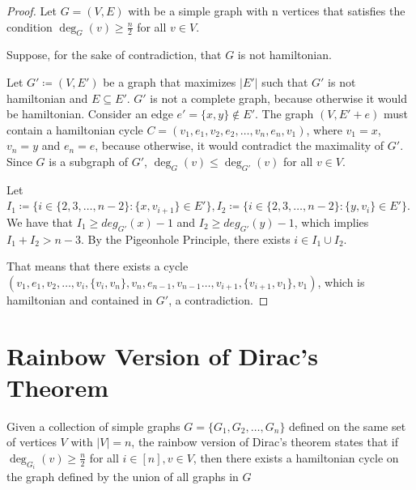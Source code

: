 \begin{proof}
    Let $G = (V, E)$ with be a simple graph with n vertices that satisfies the condition $\deg_G(v) \geq \frac{n}{2}$ for all $v \in V$.

    Suppose, for the sake of contradiction, that $G$ is not hamiltonian. 

    Let $G' \coloneqq (V, E')$ be a graph that maximizes $|E'|$ such that $G'$ is not hamiltonian and $E \subseteq E'$. 
    $G'$ is not a complete graph, because otherwise it would be hamiltonian. Consider an edge $e' = \{x, y\} \not\in E'$.
    The graph $(V, E' + e)$ must contain a hamiltonian cycle $C = (v_1, e_1, v_2, e_2, \ldots, v_n, e_{n}, v_1)$, where 
    $v_1 = x$, $v_n = y$ and $e_n = e$, because otherwise, it would contradict the maximality of $G'$.
    Since $G$ is a subgraph of $G'$, $\deg_G(v) \leq \deg_{G'}(v)$ for all $v \in V$.

    Let $I_1 \coloneqq \{i \in \{2, 3, \dots, n-2\} : \{x, v_{i+1}\} \in E'\}, 
    I_2 \coloneqq \{ i \in \{2, 3, \dots, n - 2\} : \{y, v_{i}\} \in E' \}$.
    We have that $I_1 \geq deg_{G'}(x) - 1$ and $I_2 \geq deg_{G'}(y) - 1$,
    which implies $I_1 + I_2 > n - 3$. By the Pigeonhole Principle, there exists $i \in I_1 \cup I_2$.

    That means that there exists a cycle 
    $(v_1, e_1, v_2, \dots, v_i, \{v_i, v_n\}, v_n, e_{n - 1}, v_{n-1} \dots , v_{i+1}, \{v_{i+1}, v_1\}, v_1)$, which is hamiltonian and contained in $G'$, a contradiction.

\end{proof}

\section{Rainbow Version of Dirac's Theorem}

Given a collection of simple graphs $G = \{G_1, G_2, \ldots, G_n\}$ defined on the same set of vertices $V$ with $|V| = n$,
the rainbow version of Dirac's theorem states that if $\deg_{G_i}(v) \geq \frac{n}{2}$ for all $i \in [n], v \in V$, 
then there exists a hamiltonian cycle on the graph defined by the union of all graphs in $G$
